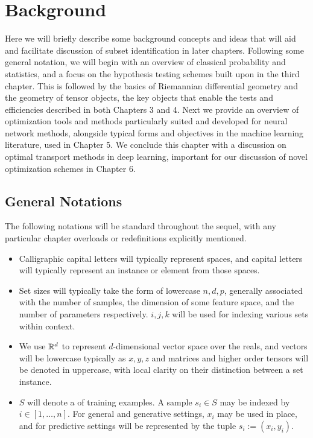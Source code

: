 \chapter{Background}\label{chap:bknd}

Here we will briefly describe some background concepts and ideas that will aid and facilitate discussion of subset identification in later chapters. 
Following some general notation,
we will begin with an overview
of classical probability and statistics,
and a focus on the hypothesis testing
schemes built upon in the third chapter.
This is followed by the basics of Riemannian differential geometry
and the geometry of tensor objects,
the key objects that enable the 
tests and efficiencies described in both 
Chapters 3 and 4.
Next we provide
an overview of optimization tools
and methods particularly suited
and developed for neural network methods,
alongside typical forms and objectives 
in the machine learning literature,
used in Chapter 5.
We conclude this chapter
with a discussion on optimal transport
methods in deep learning, important
for our discussion of novel optimization schemes
in Chapter 6.

\section{General Notations}
The following notations will be standard throughout the sequel, with any particular chapter overloads or redefinitions explicitly mentioned.
\begin{itemize}
\item Calligraphic capital letters will typically represent spaces, and capital letters will typically represent an instance or element from those spaces.

\item Set sizes will typically take the form of lowercase $n,d,p$, generally associated with the number of samples, the dimension of some feature space, and the number of parameters respectively. $i,j,k$ will be used for indexing various sets within context.

\item We use $\mathbb{R}^d$ to represent $d$-dimensional vector space over the reals, and vectors will be lowercase typically as $x,y,z$ and matrices and higher order tensors will be denoted in uppercase, with local clarity on their distinction between a set instance.

\item $S$ will denote a of training examples.
A sample $s_i\in S$ may be indexed by $i \in [1,\ldots,n]$. 
For general and generative settings, $x_i$ may be used in place, and for predictive settings will be represented by the tuple $s_i:=(x_i,y_i)$.

\end{itemize}

